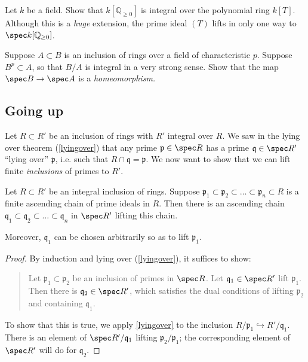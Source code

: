\begin{exercise} Let $k$ be a field.
Show that $k[\mathbb{Q}_{\geq 0}]$ is integral over the polynomial ring $k[T]$.
Although this is a \emph{huge} extension,  the prime ideal $(T)$ lifts in only
one way to $\spec k[\mathbb{Q}_{\geq 0}]$.
\end{exercise} 

\begin{exercise} 
Suppose $A \subset B$ is an inclusion of rings over a field of characteristic
$p$. Suppose $B^p \subset A$, so that $B/A$ is integral in a very strong sense. 
Show that the map $\spec B \to \spec A$ is a \emph{homeomorphism.} 
\end{exercise} 



\subsection{Going up}
Let $R \subset R'$ be an inclusion of rings with $R'$ integral over $R$. We saw in the
lying over theorem (\cref{lyingover}) that any prime $\mathfrak{p} \in \spec R$ 
has a prime $\mathfrak{q} \in \spec R'$ ``lying over'' $\mathfrak{p}$, i.e.
such that $R \cap \mathfrak{q} = \mathfrak{p}$.
We now want to show that we can lift finite \emph{inclusions} of primes to $R'$.

\begin{proposition}[Going up]
Let $R \subset R'$ be an integral inclusion of rings.
Suppose $\mathfrak{p}_1 \subset \mathfrak{p}_2 \subset \dots \subset
\mathfrak{p}_n \subset R$ is a 
finite ascending chain of prime ideals in $R$.
Then there is an ascending chain $\mathfrak{q}_1 \subset \mathfrak{q}_2 \subset
\dots \subset \mathfrak{q}_n$ in $\spec R'$ lifting this chain. 

Moreover, $\mathfrak{q}_1$ can be chosen arbitrarily so as to lift
$\mathfrak{p}_1$.
\end{proposition} 
\begin{proof} 
By induction and lying over (\cref{lyingover}), it suffices to show:
\begin{quote}
Let $\mathfrak{p}_1 \subset \mathfrak{p}_2$ be an inclusion of primes in $\spec
R$. Let $\mathfrak{q}_1 \in \spec R'$ lift $\mathfrak{p}_1$. Then there is
$\mathfrak{q}_2 \in \spec R'$, which satisfies the dual conditions of lifting
$\mathfrak{p}_2$ and containing $\mathfrak{q}_1$.
\end{quote}
To show that this is true, we apply \cref{lyingover} to the inclusion
$R/\mathfrak{p}_1 \hookrightarrow R'/\mathfrak{q}_1$. There is an element of
$\spec R'/\mathfrak{q}_1$ lifting $\mathfrak{p}_2/\mathfrak{p}_1$; the
corresponding element of $\spec R'$ will do for $\mathfrak{q}_2$.
\end{proof} 

